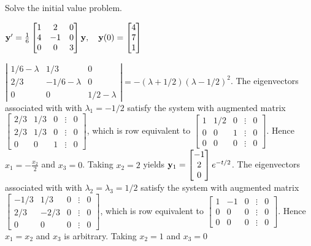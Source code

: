 \documentclass{ximera}
\begin{document}
\begin{problem}\label{exer:10.4.20}
Solve the initial value problem.

$ {\bf y}'=\frac{1}{6} \begin{bmatrix}1&2&0\\4&-1&0\\0&0&3\end{bmatrix}{\bf y},\quad{\bf
y}(0)= \begin{bmatrix}4\\7\\1\end{bmatrix}$

\begin{solution}
    $ \left|\begin{array}{ccc}1/6-\lambda&1/3&0\\
2/3&-1/6-\lambda&0\\
0&0&1/2-\lambda\end{array}\right|=-(\lambda+1/2)(\lambda-1/2)^2$.
The eigenvectors associated with
 with $\lambda_1=-1/2$ satisfy the system with  augmented matrix
$  \begin{bmatrix}2/3&1/3&0&\vdots&0
\\2/3&1/3&0&\vdots&0\\0&0&1&\vdots&0
 \end{bmatrix}$,
which is row equivalent to
$  \begin{bmatrix}1&1/2&0&\vdots&0\\0&0&1&
\vdots&0\\0&0&0&\vdots&0 \end{bmatrix}$.
Hence $x_1=-\frac{x_2 }{2}$ and $x_3=0$.  Taking $x_2=2$ yields
${\bf y}_1=  \begin{bmatrix}-1\\2\\0
 \end{bmatrix}e^{-t/2}$.
The eigenvectors associated with
 with $\lambda_2=\lambda_3=1/2$ satisfy the system with  augmented
matrix
$  \begin{bmatrix}-1/3&1/3&0&\vdots&0\\
2/3&-2/3&0&\vdots&0\\0&0&0&\vdots&0
 \end{bmatrix}$,
which is row equivalent to
$  \begin{bmatrix}1&-1&0&\vdots&0\\0&0&0&
\vdots&0\\0&0&0&\vdots&0 \end{bmatrix}$.
Hence $x_1=x_2$ and $x_3$ is arbitrary.  Taking $x_2=1$ and $x_3=0$

\end{solution}
\end{problem}
\end{document}
